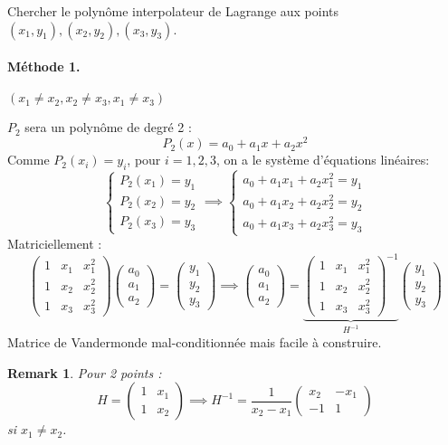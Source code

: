 \documentclass{article}
\newtheorem{remark}{Remark}
\begin{document}
Chercher le polynôme interpolateur de Lagrange aux points $(x_1, y_1), (x_2, y_2), (x_3, y_3)$.

\paragraph{Méthode 1.} $(x_1 \neq x_2, x_2 \neq x_3, x_1 \neq x_3)$

$P_2$ sera un polynôme de degré 2 :
\[
P_2(x) = a_0 + a_1 x + a_2 x^2
\]
Comme $P_2(x_i) = y_i$, pour $i=1, 2, 3$, on a le système d'équations linéaires:
\[
\begin{cases}
P_2(x_1) = y_1 \\
P_2(x_2) = y_2 \\
P_2(x_3) = y_3
\end{cases}
\implies
\begin{cases}
a_0 + a_1 x_1 + a_2 x_1^2 = y_1 \\
a_0 + a_1 x_2 + a_2 x_2^2 = y_2 \\
a_0 + a_1 x_3 + a_2 x_3^2 = y_3
\end{cases}
\]
Matriciellement :
\[
\begin{pmatrix}
1 & x_1 & x_1^2 \\
1 & x_2 & x_2^2 \\
1 & x_3 & x_3^2
\end{pmatrix}
\begin{pmatrix} a_0 \\ a_1 \\ a_2 \end{pmatrix} = \begin{pmatrix} y_1 \\ y_2 \\ y_3 \end{pmatrix}
\implies
\begin{pmatrix} a_0 \\ a_1 \\ a_2 \end{pmatrix} = \underbrace{ \begin{pmatrix}
1 & x_1 & x_1^2 \\
1 & x_2 & x_2^2 \\
1 & x_3 & x_3^2
\end{pmatrix}^{-1} }_{H^{-1}} \begin{pmatrix} y_1 \\ y_2 \\ y_3 \end{pmatrix}
\]
Matrice de Vandermonde mal-conditionnée mais facile à construire.

\begin{remark}
Pour 2 points :
\[
H = \begin{pmatrix} 1 & x_1 \\ 1 & x_2 \end{pmatrix}
\implies
H^{-1} = \frac{1}{x_2-x_1} \begin{pmatrix} x_2 & -x_1 \\ -1 & 1 \end{pmatrix}
\]
si $x_1 \neq x_2$.
\end{remark}
\end{document}
